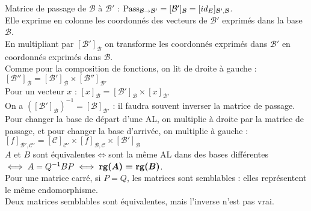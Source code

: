 	Matrice de passage de $\mathcal{B}$ à $\mathcal{B}'$ : $\textrm{Pass}_{\mathcal{B} \rightarrow \mathcal{B}'} = [\mathcal{B}']_\mathcal{B} =  [id_E]_{\mathcal{B}',\mathcal{B}}$.\\
	Elle exprime en colonne les coordonnés des vecteurs de $\mathcal{B}'$ exprimés dans la base $\mathcal{B}$.\\
	
	En multipliant par $[\mathcal{B}']_\mathcal{B}$ on transforme les coordonnés exprimés dans $\mathcal{B}'$ en coordonnés exprimés dans $\mathcal{B}$.\\
	Comme pour la composition de fonctions, on lit de droite à gauche : $[\mathcal{B''}]_{\mathcal{B}} = [\mathcal{B'}]_{\mathcal{B}} \times [\mathcal{B}'']_{\mathcal{B}'}$\\
	Pour un vecteur $x$ : $[x]_{\mathcal{B}} = [\mathcal{B'}]_\mathcal{B} \times [x]_{\mathcal{B}'}$
	\vspace{5pt}\\
	On a $([\mathcal{B}']_\mathcal{B})^{-1} = [\mathcal{B}]_{\mathcal{B}'}$ : il faudra souvent inverser la matrice de passage.
	\vspace{5pt}\\
	Pour changer la base de départ d'une AL, on multiplie à droite par la matrice de passage, et pour changer la base d'arrivée, on multiplie à gauche : $[f]_{\mathcal{B}',\mathcal{C}'} = [\mathcal{C}]_{\mathcal{C'}} \times [f]_{\mathcal{B},\mathcal{C}} \times [\mathcal{B'}]_{\mathcal{B}}$\\
	
	$A$ et $B$ sont équivalentes$\iff$sont la même AL dans des bases différentes$\iff A = Q^{-1} B P \iff \boldsymbol{\operatorname{rg}(A) = \operatorname{rg}(B)}$.\\
	Pour une matrice carré, si $P = Q$, les matrices sont semblables : elles représentent le même endomorphisme.\\
	
	Deux matrices semblables sont équivalentes, mais l'inverse n'est pas vrai.

